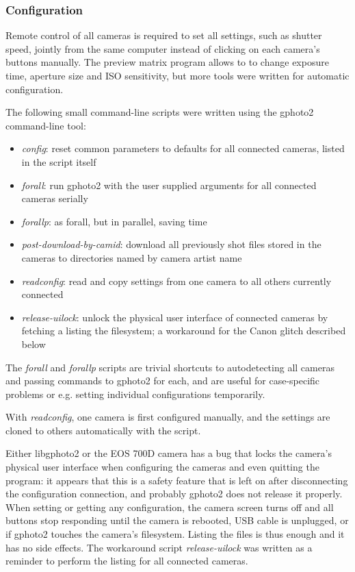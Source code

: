 
\subsubsection{Configuration} %

Remote control of all cameras is required to set all settings, such as shutter speed, jointly from the same computer instead of clicking on each camera's buttons manually.
The preview matrix program allows to to change exposure time, aperture size and ISO sensitivity, but more tools were written for automatic configuration.

The following small command-line scripts were written using the gphoto2 command-line tool:

\begin{itemize}
	\item \emph{config}: reset common parameters to defaults for all connected cameras, listed in the script itself
	\item \emph{forall}: run gphoto2 with the user supplied arguments for all connected cameras serially
	\item \emph{forallp}: as forall, but in parallel, saving time
	\item \emph{post-download-by-camid}: download all previously shot files stored in the cameras to directories named by camera artist name
	\item \emph{readconfig}: read and copy settings from one camera to all others currently connected
	\item \emph{release-uilock}: unlock the physical user interface of connected cameras by fetching a listing the filesystem; a workaround for the Canon glitch described below
\end{itemize}

The \emph{forall} and \emph{forallp} scripts are trivial shortcuts to autodetecting all cameras and passing commands to gphoto2 for each, and are useful for case-specific problems or e.g. setting individual configurations temporarily.

With \emph{readconfig}, one camera is first configured manually, and the settings are cloned to others automatically with the script.

Either libgphoto2 or the EOS 700D camera has a bug that locks the camera's physical user interface when configuring the cameras and even quitting the program:
it appears that this is a safety feature that is left on after disconnecting the configuration connection, and probably gphoto2 does not release it properly.
When setting or getting any configuration, the camera screen turns off and all buttons stop responding until the camera is rebooted, USB cable is unplugged, or if gphoto2 touches the camera's filesystem.
Listing the files is thus enough and it has no side effects.
The workaround script \emph{release-uilock} was written as a reminder to perform the listing for all connected cameras.

